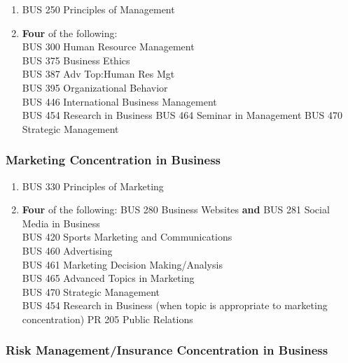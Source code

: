 \documentclass[
  letterpaper,
]{scrbook}
\providecommand{\tightlist}{%
  \setlength{\itemsep}{0pt}\setlength{\parskip}{0pt}}
\begin{document}
\begin{enumerate}
\def\labelenumi{\arabic{enumi}.}
\tightlist
\item
  BUS 250 Principles of Management
\item
  \textbf{Four} of the following:\\
  BUS 300 Human Resource Management\\
  BUS 375 Business Ethics\\
  BUS 387 Adv Top:Human Res Mgt\\
  BUS 395 Organizational Behavior\\
  BUS 446 International Business Management\\
  BUS 454 Research in Business BUS 464 Seminar in Management BUS 470
  Strategic Management
\end{enumerate}

\subsubsection{Marketing Concentration in
Business}\label{marketing-concentration-in-business}

\begin{enumerate}
\def\labelenumi{\arabic{enumi}.}
\tightlist
\item
  BUS 330 Principles of Marketing\\
\item
  \textbf{Four} of the following: BUS 280 Business Websites \textbf{and}
  BUS 281 Social Media in Business\\
  BUS 420 Sports Marketing and Communications\\
  BUS 460 Advertising\\
  BUS 461 Marketing Decision Making/Analysis\\
  BUS 465 Advanced Topics in Marketing\\
  BUS 470 Strategic Management\\
  BUS 454 Research in Business (when topic is appropriate to marketing
  concentration) PR 205 Public Relations
\end{enumerate}

\subsubsection{Risk Management/Insurance Concentration in
Business}\label{risk-managementinsurance-concentration-in-business}
\end{document}
